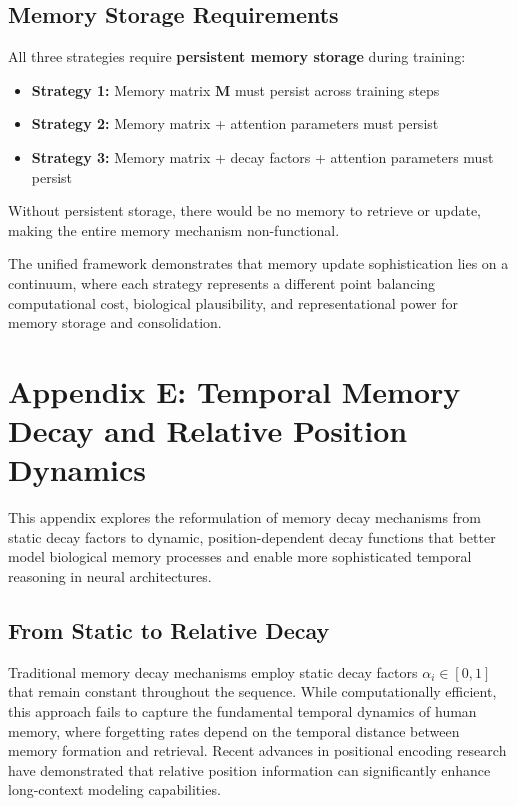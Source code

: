 \documentclass{article}
\begin{document}
\subsection{Memory Storage Requirements}

All three strategies require \textbf{persistent memory storage} during training:

\begin{itemize}
\item \textbf{Strategy 1:} Memory matrix $\mathbf{M}$ must persist across training steps
\item \textbf{Strategy 2:} Memory matrix + attention parameters must persist
\item \textbf{Strategy 3:} Memory matrix + decay factors + attention parameters must persist
\end{itemize}

Without persistent storage, there would be no memory to retrieve or update, making the entire memory mechanism non-functional.

The unified framework demonstrates that memory update sophistication lies on a continuum, where each strategy represents a different point balancing computational cost, biological plausibility, and representational power for memory storage and consolidation.

\section{Appendix E: Temporal Memory Decay and Relative Position Dynamics}

This appendix explores the reformulation of memory decay mechanisms from static decay factors to dynamic, position-dependent decay functions that better model biological memory processes and enable more sophisticated temporal reasoning in neural architectures.

\subsection{From Static to Relative Decay}

Traditional memory decay mechanisms employ static decay factors $\alpha_i \in [0,1]$ that remain constant throughout the sequence. While computationally efficient, this approach fails to capture the fundamental temporal dynamics of human memory, where forgetting rates depend on the temporal distance between memory formation and retrieval. Recent advances in positional encoding research have demonstrated that relative position information can significantly enhance long-context modeling capabilities.
\end{document}
